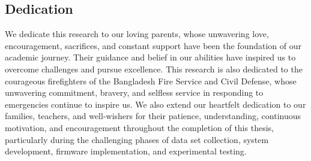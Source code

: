 \begin{center}
    \section*{Dedication}
\end{center}
We dedicate this research to our loving parents, whose unwavering love, encouragement, sacriﬁces, and constant support have been the foundation of our academic journey. Their guidance and belief in our abilities have inspired us to overcome challenges and pursue excellence. This research is also dedicated to the courageous firefighters of the Bangladesh Fire Service and Civil Defense, whose unwavering commitment, bravery, and selfless service in responding to emergencies continue to inspire us. We also extend our heartfelt dedication to our families, teachers, and well-wishers for their patience, understanding, continuous motivation, and encouragement throughout the completion of this thesis, particularly during the challenging phases of data set collection, system development, firmware implementation, and experimental testing.